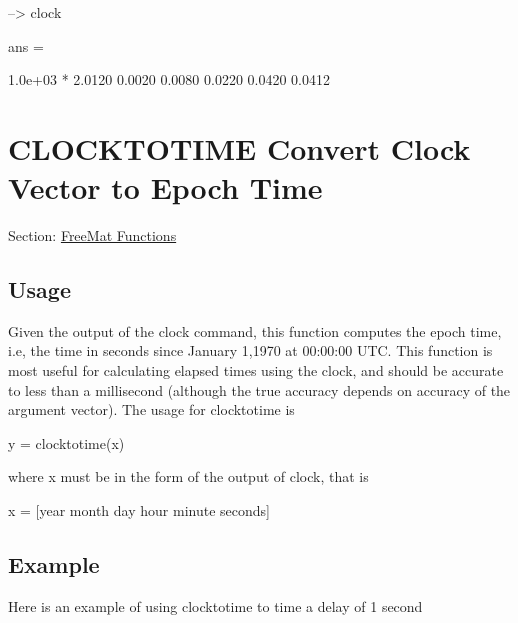 \begin{DoxyVerbInclude}
--> clock

ans = 

   1.0e+03 * 
    2.0120    0.0020    0.0080    0.0220    0.0420    0.0412 
\end{DoxyVerbInclude}
 \hypertarget{freemat_clocktotime}{}\section{C\-L\-O\-C\-K\-T\-O\-T\-I\-M\-E Convert Clock Vector to Epoch Time}\label{freemat_clocktotime}
Section\-: \hyperlink{sec_freemat}{Free\-Mat Functions} \hypertarget{vtkwidgets_vtkxyplotwidget_Usage}{}\subsection{Usage}\label{vtkwidgets_vtkxyplotwidget_Usage}
Given the output of the {\ttfamily clock} command, this function computes the epoch time, i.\-e, the time in seconds since January 1,1970 at 00\-:00\-:00 U\-T\-C. This function is most useful for calculating elapsed times using the clock, and should be accurate to less than a millisecond (although the true accuracy depends on accuracy of the argument vector). The usage for {\ttfamily clocktotime} is \begin{DoxyVerb}   y = clocktotime(x)
\end{DoxyVerb}
 where {\ttfamily x} must be in the form of the output of {\ttfamily clock}, that is \begin{DoxyVerb}   x = [year month day hour minute seconds]
\end{DoxyVerb}
 \hypertarget{variables_struct_Example}{}\subsection{Example}\label{variables_struct_Example}
Here is an example of using {\ttfamily clocktotime} to time a delay of 1 second


